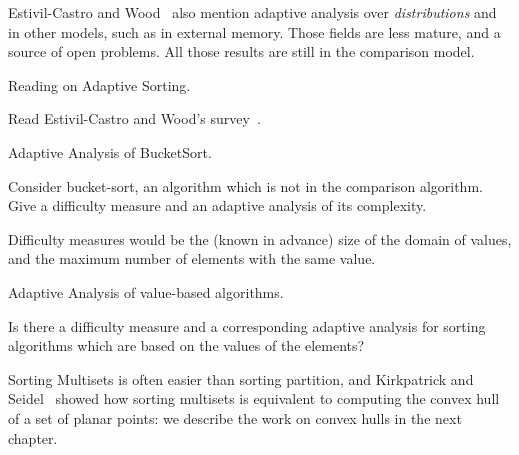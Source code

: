 Estivil-Castro and Wood~\cite{estivillcastro92survey} also mention
adaptive analysis over {\em distributions} and in other models, such
as in external memory. 
%
Those fields are less mature, and a source of
open problems. 
%
All those results are still in the comparison model.

\begin{homework}[e]
\caption{Reading on Adaptive Sorting.}
  Read Estivil-Castro and Wood's survey~\cite{estivillcastro92survey}.
\end{homework}

\begin{homework}[e]
\caption{Adaptive Analysis of BucketSort. \label{hmw:bucketSort}}
  Consider bucket-sort, an algorithm which is not in the comparison
  algorithm. Give a difficulty measure and an adaptive analysis of its
  complexity.
  \begin{solution}
    Difficulty measures would be the (known in advance) size of the
    domain of values, and the maximum number of elements with the same
    value.
  \end{solution}
\end{homework}

\begin{openproblem}
\caption{Adaptive Analysis of value-based algorithms.\label{opb:valueBasedSorting}}
  Is there a difficulty measure and a corresponding adaptive analysis
  for sorting algorithms which are based on the values of the
  elements?
\end{openproblem}

Sorting Multisets is often easier than sorting partition, and
Kirkpatrick and Seidel~\cite{kirkpatrick} showed how sorting multisets
is equivalent to computing the convex hull of a set of planar points:
we describe the work on convex hulls in the next chapter.








